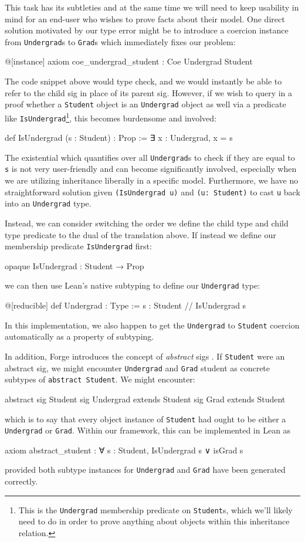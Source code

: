 This task has its subtleties and at the same time we will need to keep usability in mind for an end-user who wishes to prove facts about their model. One direct solution motivated by our type error might be to introduce a coercion instance from \texttt{Undergrad}s to \texttt{Grad}s which immediately fixes our problem:
\begin{lean*}@[instance] axiom coe_undergrad_student : Coe Undergrad Student\end{lean*}
The code snippet above would type check, and we would instantly be able to refer to the child sig in place of its parent sig. However, if we wish to query in a proof whether a \texttt{Student} object is an \texttt{Undergrad} object as well via a predicate like \texttt{IsUndergrad}\footnote{This is the \texttt{Undergrad} membership predicate on \texttt{Student}s, which we'll likely need to do in order to prove anything about objects within this inheritance relation.}, this becomes burdensome and involved:
\begin{lean*}def IsUndergrad (s : Student) : Prop := ∃ x : Undergrad, x = s\end{lean*}
The existential which quantifies over all \texttt{Undergrad}s to check if they are equal to \texttt{s} is not very user-friendly and can become significantly involved, especially when we are utilizing inheritance liberally in a specific model. Furthermore, we have no straightforward solution given \texttt{(IsUndergrad u)} and \texttt{(u: Student)} to cast \texttt{u} back into an \texttt{Undergrad} type. 

Instead, we can consider switching the order we define the child type and child type predicate to the dual of the translation above. If instead we define our membership predicate \texttt{IsUndergrad} first:
\begin{lean*}opaque IsUndergrad : Student → Prop\end{lean*}
we can then use Lean's native subtyping to define our \texttt{Undergrad} type:
\begin{lean*}
@[reducible] def Undergrad : Type :=
  { s : Student // IsUndergrad s }
\end{lean*}
In this implementation, we also happen to get the \texttt{Undergrad} to \texttt{Student} coercion automatically as a property of subtyping.

In addition, Forge introduces the concept of \emph{abstract} sigs \cite{jackson2012software}. If \texttt{Student} were an abstract sig, we might encounter \texttt{Undergrad} and \texttt{Grad} student as concrete subtypes of \texttt{abstract Student}. We might encounter:
\begin{forge*}
abstract sig Student {}
sig Undergrad extends Student {}
sig Grad extends Student {}
\end{forge*}
which is to say that every object instance of \texttt{Student} had ought to be either a \texttt{Undergrad} or \texttt{Grad}. Within our framework, this can be implemented in Lean as
\begin{lean*}
axiom abstract_student : ∀ s : Student, IsUndergrad s ∨ isGrad s
\end{lean*}
provided both subtype instances for \texttt{Undergrad} and \texttt{Grad} have been generated correctly. 

